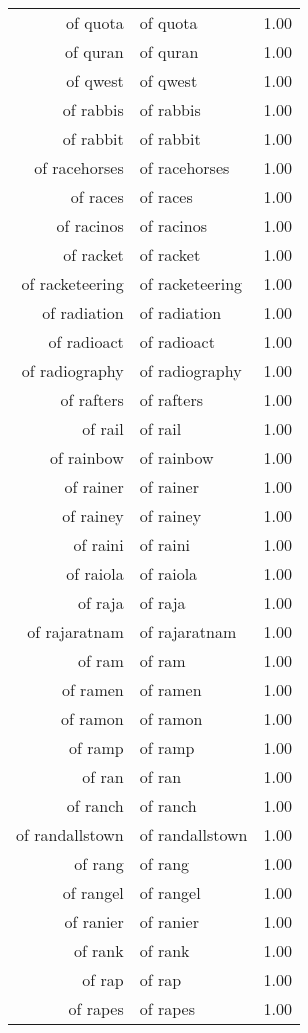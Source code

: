 \begin{table}[ht]
\begin{tabular}{rlr}
  of quota & of quota & 1.00 \\ 
  of quran & of quran & 1.00 \\ 
  of qwest & of qwest & 1.00 \\ 
  of rabbis & of rabbis & 1.00 \\ 
  of rabbit & of rabbit & 1.00 \\ 
  of racehorses & of racehorses & 1.00 \\ 
  of races & of races & 1.00 \\ 
  of racinos & of racinos & 1.00 \\ 
  of racket & of racket & 1.00 \\ 
  of racketeering & of racketeering & 1.00 \\ 
  of radiation & of radiation & 1.00 \\ 
  of radioact & of radioact & 1.00 \\ 
  of radiography & of radiography & 1.00 \\ 
  of rafters & of rafters & 1.00 \\ 
  of rail & of rail & 1.00 \\ 
  of rainbow & of rainbow & 1.00 \\ 
  of rainer & of rainer & 1.00 \\ 
  of rainey & of rainey & 1.00 \\ 
  of raini & of raini & 1.00 \\ 
  of raiola & of raiola & 1.00 \\ 
  of raja & of raja & 1.00 \\ 
  of rajaratnam & of rajaratnam & 1.00 \\ 
  of ram & of ram & 1.00 \\ 
  of ramen & of ramen & 1.00 \\ 
  of ramon & of ramon & 1.00 \\ 
  of ramp & of ramp & 1.00 \\ 
  of ran & of ran & 1.00 \\ 
  of ranch & of ranch & 1.00 \\ 
  of randallstown & of randallstown & 1.00 \\ 
  of rang & of rang & 1.00 \\ 
  of rangel & of rangel & 1.00 \\ 
  of ranier & of ranier & 1.00 \\ 
  of rank & of rank & 1.00 \\ 
  of rap & of rap & 1.00 \\ 
  of rapes & of rapes & 1.00 \\ 

\end{tabular}
\end{table}
